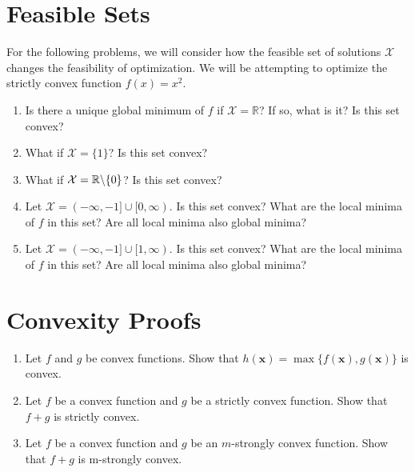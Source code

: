 \documentclass{article}
\begin{document}
\section{Feasible Sets}
For the following problems, we will consider how the feasible set of solutions $\mathcal{X}$ changes the feasibility of optimization. We will be attempting to optimize the strictly convex function $f(x) = x^2$.
\begin{enumerate}[label=\arabic*.]
\item Is there a unique global minimum of $f$ if $\mathcal{X} = \mathbb{R}$? If so, what is it? Is this set convex?
\item What if $\mathcal{X} = \{ 1\}$? Is this set convex?
\item What if $\mathcal{X} = \mathbb{R} \char`\\ \{ 0 \}$? Is this set convex?
\item Let $\mathcal{X} = (-\infty, -1] \cup [0, \infty )$. Is this set convex? What are the local minima of $f$ in this set? Are all local minima also global minima?
\item Let $\mathcal{X} = (-\infty, -1] \cup [1, \infty )$. Is this set convex? What are the local minima of $f$ in this set? Are all local minima also global minima?
\end{enumerate}

\section{Convexity Proofs}
\begin{enumerate}[label=\arabic*.]
\item Let $f$ and $g$ be convex functions. Show that $h(\mathbf{x}) = \max \{f(\mathbf{x}), g(\mathbf{x})\}$ is convex.
\item Let $f$ be a convex function and $g$ be a strictly convex function. Show that $f + g$ is strictly convex.
\item Let $f$ be a convex function and $g$ be an $m$-strongly convex function. Show that $f + g$ is m-strongly convex.
\end{enumerate}
\end{document}
